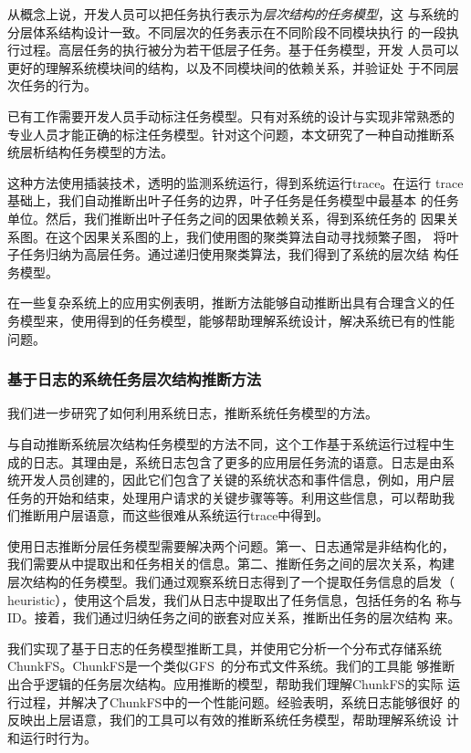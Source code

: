 从概念上说，开发人员可以把任务执行表示为\emph{层次结构的任务模型}，这
与系统的分层体系结构设计一致。不同层次的任务表示在不同阶段不同模块执行
的一段执行过程。高层任务的执行被分为若干低层子任务。基于任务模型，开发
人员可以更好的理解系统模块间的结构，以及不同模块间的依赖关系，并验证处
于不同层次任务的行为。

已有工作需要开发人员手动标注任务模型。只有对系统的设计与实现非常熟悉的
专业人员才能正确的标注任务模型。针对这个问题，本文研究了一种自动推断系
统层析结构任务模型的方法。

这种方法使用插装技术，透明的监测系统运行，得到系统运行trace。在运行
trace基础上，我们自动推断出叶子任务的边界，叶子任务是任务模型中最基本
的任务单位。然后，我们推断出叶子任务之间的因果依赖关系，得到系统任务的
因果关系图。在这个因果关系图的上，我们使用图的聚类算法自动寻找频繁子图，
将叶子任务归纳为高层任务。通过递归使用聚类算法，我们得到了系统的层次结
构任务模型。

在一些复杂系统上的应用实例表明，推断方法能够自动推断出具有合理含义的任
务模型来，使用得到的任务模型，能够帮助理解系统设计，解决系统已有的性能
问题。

\subsubsection*{基于日志的系统任务层次结构推断方法}


我们进一步研究了如何利用系统日志，推断系统任务模型的方法。

与自动推断系统层次结构任务模型的方法不同，这个工作基于系统运行过程中生
成的日志。其理由是，系统日志包含了更多的应用层任务流的语意。日志是由系
统开发人员创建的，因此它们包含了关键的系统状态和事件信息，例如，用户层
任务的开始和结束，处理用户请求的关键步骤等等。利用这些信息，可以帮助我
们推断用户层语意，而这些很难从系统运行trace中得到。

使用日志推断分层任务模型需要解决两个问题。第一、日志通常是非结构化的，
我们需要从中提取出和任务相关的信息。第二、推断任务之间的层次关系，构建
层次结构的任务模型。我们通过观察系统日志得到了一个提取任务信息的启发（
heuristic），使用这个启发，我们从日志中提取出了任务信息，包括任务的名
称与ID。接着，我们通过归纳任务之间的嵌套对应关系，推断出任务的层次结构
来。

我们实现了基于日志的任务模型推断工具，并使用它分析一个分布式存储系统
ChunkFS。ChunkFS是一个类似GFS~\cite{gfs}的分布式文件系统。我们的工具能
够推断出合乎逻辑的任务层次结构。应用推断的模型，帮助我们理解ChunkFS的实际
运行过程，并解决了ChunkFS中的一个性能问题。经验表明，系统日志能够很好
的反映出上层语意，我们的工具可以有效的推断系统任务模型，帮助理解系统设
计和运行时行为。

